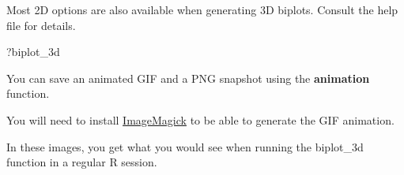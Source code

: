 \documentclass[12pt,]{book}
\newenvironment{Shaded}{\begin{snugshade}}{\end{snugshade}}
\newcommand{\DataTypeTok}[1]{\textcolor[rgb]{0.13,0.29,0.53}{#1}}
\newcommand{\DecValTok}[1]{\textcolor[rgb]{0.00,0.00,0.81}{#1}}
\newcommand{\FloatTok}[1]{\textcolor[rgb]{0.00,0.00,0.81}{#1}}
\newcommand{\KeywordTok}[1]{\textcolor[rgb]{0.13,0.29,0.53}{\textbf{#1}}}
\newcommand{\NormalTok}[1]{#1}
\newcommand{\OperatorTok}[1]{\textcolor[rgb]{0.81,0.36,0.00}{\textbf{#1}}}
\newcommand{\StringTok}[1]{\textcolor[rgb]{0.31,0.60,0.02}{#1}}
\begin{document}
Most 2D options are also available when generating 3D biplots. Consult the help file for details.

\begin{Shaded}
\begin{Highlighting}[]
\NormalTok{?biplot_3d}
\end{Highlighting}
\end{Shaded}

\begin{Shaded}
\end{Shaded}

\hypertarget{rgl21648}{}

\pagebreak

You can save an animated GIF and a PNG snapshot using the \textbf{animation} function.

\begin{Shaded}
\end{Shaded}

You will need to install \href{www.imagemagick.org}{ImageMagick} to be able to generate the GIF animation.

In these images, you get what you would see when running the biplot\_3d function in a regular R session.
\end{document}
